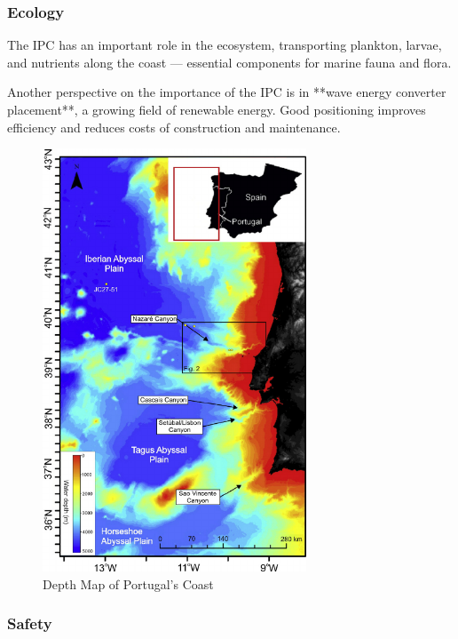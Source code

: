 \subsubsection{Ecology}

The IPC has an important role in the ecosystem, transporting plankton, larvae, and nutrients along the coast — essential components for marine fauna and flora.

Another perspective on the importance of the IPC is in **wave energy converter placement**, a growing field of renewable energy.  
Good positioning improves efficiency and reduces costs of construction and maintenance.

\begin{figure}[H]
    \centering
    \includegraphics[angle=90,origin=c,width=0.7\textwidth]{images/maps/pt_depth.png}
    \vspace{-2.2cm}
    \caption{Depth Map of Portugal's Coast}
    \label{fig:PortugalDepthMap}        
\end{figure}

\subsubsection{Safety}

